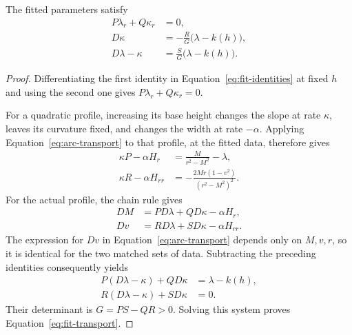 \begin{lemma}\label{lem:fit-transport}
The fitted parameters satisfy
\begin{equation}\label{eq:fit-transport}
 \begin{aligned}
 P\lambda_r+Q\kappa_r&=0,\\
 D\kappa&=-\frac{R}{G}\bigl(\lambda-k(h)\bigr),\\
 D\lambda-\kappa&=\frac{S}{G}\bigl(\lambda-k(h)\bigr).
 \end{aligned}
\end{equation}
\end{lemma}

\begin{proof}
Differentiating the first identity in Equation~\eqref{eq:fit-identities}
at fixed $h$ and using the second one gives
$P\lambda_r+Q\kappa_r=0$.

For a quadratic profile, increasing its base height changes the slope
at rate $\kappa$, leaves its curvature fixed, and changes the width at
rate $-\alpha$.  Applying Equation~\eqref{eq:arc-transport} to that
profile, at the fitted data, therefore gives
\[
 \begin{aligned}
 \kappa P-\alpha H_r
   &=\frac{M}{r^2-M^2}-\lambda,\\
 \kappa R-\alpha H_{rr}
   &=-\frac{2Mr(1-v^2)}{(r^2-M^2)^2}.
 \end{aligned}
\]
For the actual profile, the chain rule gives
\[
 \begin{aligned}
 DM&=P D\lambda+Q D\kappa-\alpha H_r,\\
 Dv&=R D\lambda+S D\kappa-\alpha H_{rr}.
 \end{aligned}
\]
The expression for $Dv$ in Equation~\eqref{eq:arc-transport} depends
only on $M,v,r$, so it is identical for the two matched sets of data.
Subtracting the preceding identities consequently yields
\[
 \begin{aligned}
 P(D\lambda-\kappa)+Q D\kappa&=\lambda-k(h),\\
 R(D\lambda-\kappa)+S D\kappa&=0.
 \end{aligned}
\]
Their determinant is $G=PS-QR>0$.  Solving this system proves
Equation~\eqref{eq:fit-transport}.

\end{proof}

